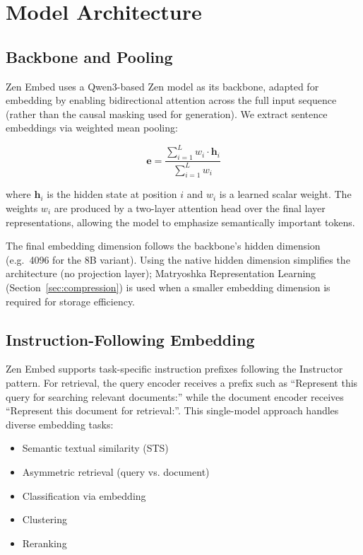 \documentclass[11pt,a4paper]{article}
\begin{document}
\section{Model Architecture}

\subsection{Backbone and Pooling}

Zen Embed uses a Qwen3-based Zen model as its backbone, adapted for embedding by enabling bidirectional attention across the full input sequence (rather than the causal masking used for generation). We extract sentence embeddings via weighted mean pooling:

\begin{equation}
\mathbf{e} = \frac{\sum_{i=1}^{L} w_i \cdot \mathbf{h}_i}{\sum_{i=1}^{L} w_i}
\end{equation}

where $\mathbf{h}_i$ is the hidden state at position $i$ and $w_i$ is a learned scalar weight. The weights $w_i$ are produced by a two-layer attention head over the final layer representations, allowing the model to emphasize semantically important tokens.

The final embedding dimension follows the backbone's hidden dimension (e.g.\ 4096 for the 8B variant). Using the native hidden dimension simplifies the architecture (no projection layer); Matryoshka Representation Learning (Section~\ref{sec:compression}) is used when a smaller embedding dimension is required for storage efficiency.

\subsection{Instruction-Following Embedding}

Zen Embed supports task-specific instruction prefixes following the Instructor pattern. For retrieval, the query encoder receives a prefix such as ``Represent this query for searching relevant documents:'' while the document encoder receives ``Represent this document for retrieval:''. This single-model approach handles diverse embedding tasks:

\begin{itemize}
  \item Semantic textual similarity (STS)
  \item Asymmetric retrieval (query vs. document)
  \item Classification via embedding
  \item Clustering
  \item Reranking
\end{itemize}
\end{document}
